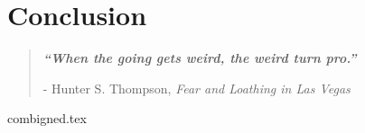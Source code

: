 

\chapter{ Conclusion }\label{ch6}


\blankpage
\restoregeometry
\vspace*{0.15\paperheight}


\begin{center}
\begin{quotation}
  \large{\emph{\textbf{``When the going gets weird, the weird turn pro.''} }  }  \\
  \begin{flushright}
  - Hunter S. Thompson, \textit{Fear and Loathing in Las Vegas}
  \end{flushright}
 \end{quotation}
\end{center}
\doublespacing



 \onehalfspacing

%
 \newpage

%
{combigned.tex}
%
